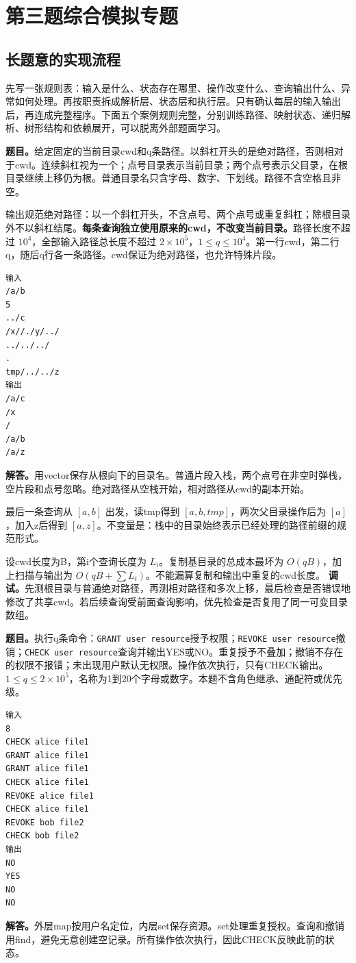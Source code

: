 \section{第三题综合模拟专题}
\subsection{长题意的实现流程}
先写一张规则表：输入是什么、状态存在哪里、操作改变什么、查询输出什么、异常如何处理。再按职责拆成解析层、状态层和执行层。只有确认每层的输入输出后，再连成完整程序。下面五个案例规则完整，分别训练路径、映射状态、递归解析、树形结构和依赖展开，可以脱离外部题面学习。

\textbf{题目。}给定固定的当前目录cwd和q条路径。以斜杠开头的是绝对路径，否则相对于cwd。连续斜杠视为一个；点号目录表示当前目录；两个点号表示父目录，在根目录继续上移仍为根。普通目录名只含字母、数字、下划线。路径不含空格且非空。

输出规范绝对路径：以一个斜杠开头，不含点号、两个点号或重复斜杠；除根目录外不以斜杠结尾。\textbf{每条查询独立使用原来的cwd，不改变当前目录。}路径长度不超过 $10^4$，全部输入路径总长度不超过 $2\times10^5$，$1\le q\le10^4$。第一行cwd，第二行q，随后q行各一条路径。cwd保证为绝对路径，也允许特殊片段。
\begin{verbatim}
输入
/a/b
5
../c
/x//./y/../
../../../
.
tmp/../../z
输出
/a/c
/x
/
/a/b
/a/z
\end{verbatim}
\textbf{解答。}用vector保存从根向下的目录名。普通片段入栈，两个点号在非空时弹栈，空片段和点号忽略。绝对路径从空栈开始，相对路径从cwd的副本开始。

最后一条查询从 $[a,b]$ 出发，读tmp得到 $[a,b,tmp]$，两次父目录操作后为 $[a]$，加入z后得到 $[a,z]$。不变量是：栈中的目录始终表示已经处理的路径前缀的规范形式。

设cwd长度为B，第i个查询长度为 $L_i$。复制基目录的总成本最坏为 $O(qB)$，加上扫描与输出为 $O(qB+\sum L_i)$。不能漏算复制和输出中重复的cwd长度。
\textbf{调试。}先测根目录与普通绝对路径，再测相对路径和多次上移，最后检查是否错误地修改了共享cwd。若后续查询受前面查询影响，优先检查是否复用了同一可变目录数组。

\textbf{题目。}执行q条命令：\texttt{GRANT user resource}授予权限；\texttt{REVOKE user resource}撤销；\texttt{CHECK user resource}查询并输出YES或NO。重复授予不叠加；撤销不存在的权限不报错；未出现用户默认无权限。操作依次执行，只有CHECK输出。$1\le q\le2\times10^5$，名称为1到20个字母或数字。本题不含角色继承、通配符或优先级。
\begin{verbatim}
输入
8
CHECK alice file1
GRANT alice file1
GRANT alice file1
CHECK alice file1
REVOKE alice file1
CHECK alice file1
REVOKE bob file2
CHECK bob file2
输出
NO
YES
NO
NO
\end{verbatim}
\textbf{解答。}外层map按用户名定位，内层set保存资源。set处理重复授权。查询和撤销用find，避免无意创建空记录。所有操作依次执行，因此CHECK反映此前的状态。


